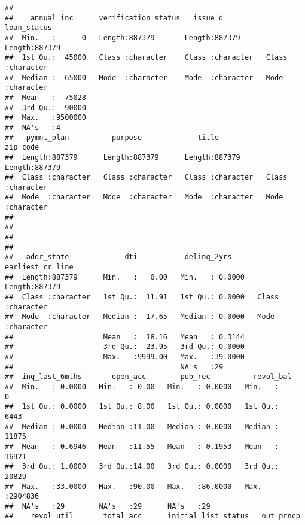 \documentclass[
]{article}
\begin{document}
\begin{verbatim}
##                                                                             
##    annual_inc      verification_status   issue_d          loan_status       
##  Min.   :      0   Length:887379       Length:887379      Length:887379     
##  1st Qu.:  45000   Class :character    Class :character   Class :character  
##  Median :  65000   Mode  :character    Mode  :character   Mode  :character  
##  Mean   :  75028                                                            
##  3rd Qu.:  90000                                                            
##  Max.   :9500000                                                            
##  NA's   :4                                                                  
##   pymnt_plan          purpose             title             zip_code        
##  Length:887379      Length:887379      Length:887379      Length:887379     
##  Class :character   Class :character   Class :character   Class :character  
##  Mode  :character   Mode  :character   Mode  :character   Mode  :character  
##                                                                             
##                                                                             
##                                                                             
##                                                                             
##   addr_state             dti           delinq_2yrs      earliest_cr_line  
##  Length:887379      Min.   :   0.00   Min.   : 0.0000   Length:887379     
##  Class :character   1st Qu.:  11.91   1st Qu.: 0.0000   Class :character  
##  Mode  :character   Median :  17.65   Median : 0.0000   Mode  :character  
##                     Mean   :  18.16   Mean   : 0.3144                     
##                     3rd Qu.:  23.95   3rd Qu.: 0.0000                     
##                     Max.   :9999.00   Max.   :39.0000                     
##                                       NA's   :29                          
##  inq_last_6mths       open_acc        pub_rec          revol_bal      
##  Min.   : 0.0000   Min.   : 0.00   Min.   : 0.0000   Min.   :      0  
##  1st Qu.: 0.0000   1st Qu.: 8.00   1st Qu.: 0.0000   1st Qu.:   6443  
##  Median : 0.0000   Median :11.00   Median : 0.0000   Median :  11875  
##  Mean   : 0.6946   Mean   :11.55   Mean   : 0.1953   Mean   :  16921  
##  3rd Qu.: 1.0000   3rd Qu.:14.00   3rd Qu.: 0.0000   3rd Qu.:  20829  
##  Max.   :33.0000   Max.   :90.00   Max.   :86.0000   Max.   :2904836  
##  NA's   :29        NA's   :29      NA's   :29                         
##    revol_util       total_acc      initial_list_status   out_prncp    

\end{verbatim}
\end{document}
